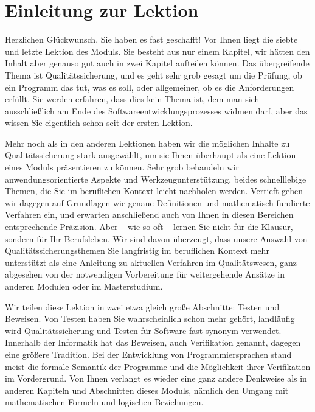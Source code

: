 \cleardoublepage
\chapter*{Einleitung zur Lektion}

Herzlichen Glückwunsch, Sie haben es fast geschafft! Vor Ihnen liegt die siebte und letzte Lektion des Moduls. Sie besteht aus nur einem Kapitel, wir hätten den Inhalt aber genauso gut auch in zwei Kapitel aufteilen können. Das übergreifende Thema ist Qualitätssicherung, und es geht sehr grob gesagt um die Prüfung, ob ein Programm das tut, was es soll, oder allgemeiner, ob es die Anforderungen erfüllt. Sie werden erfahren, dass dies kein Thema ist, dem man sich ausschließlich am Ende des Softwareentwicklungsprozesses widmen darf, aber das wissen Sie eigentlich schon seit der ersten Lektion.

Mehr noch als in den anderen Lektionen haben wir die möglichen Inhalte zu Qualitätssicherung stark ausgewählt, um sie Ihnen überhaupt als eine Lektion eines Moduls präsentieren zu können. Sehr grob behandeln wir anwendungsorientierte Aspekte und Werkzeugunterstützung, beides schnelllebige Themen, die Sie im beruflichen
Kontext leicht nachholen werden. Vertieft gehen wir dagegen auf Grundlagen wie genaue Definitionen und mathematisch fundierte Verfahren ein, und erwarten anschließend auch von Ihnen in diesen Bereichen entsprechende Präzision. Aber -- wie so oft -- lernen Sie nicht für die Klausur, sondern für Ihr Berufsleben. Wir sind davon überzeugt, dass unsere Auswahl von Qualitätssicherungsthemen Sie langfristig im beruflichen Kontext mehr unterstützt als eine Anleitung zu aktuellen Verfahren im Qualitätswesen, ganz abgesehen von der notwendigen Vorbereitung für weiter\-gehende Ansätze in anderen Modulen oder im Masterstudium.

Wir teilen diese Lektion in zwei etwa gleich große Abschnitte: Testen und Beweisen. Von Testen haben Sie wahrscheinlich schon mehr gehört, landläufig wird Qualitäts\-sicherung und Testen für Software fast synonym verwendet. Innerhalb der Informatik hat das Beweisen, auch Verifikation genannt, dagegen eine größere Tradition. Bei der Entwicklung von Programmiersprachen stand meist die formale Semantik der Programme und die Möglichkeit ihrer Verifikation im Vordergrund. Von Ihnen verlangt es wieder eine ganz andere Denkweise als in anderen Kapiteln und Abschnitten dieses Moduls, nämlich den Umgang mit mathematischen Formeln und logischen Beziehungen.

